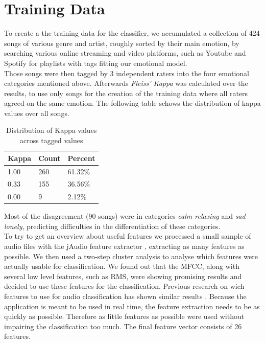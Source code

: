 \documentclass{sigchi-ext}
\begin{document}
\section{Training Data}\label{training-data}
To create a the training data for the classifier, we accumulated a collection of 424 songs of various genre and artist, roughly sorted by their main emotion, by searching various online streaming and video platforms, such as Youtube and Spotify for playlists with tags fitting our emotional model.\\
Those songs were then tagged by 3 independent raters into the four emotional categories mentioned above. Afterwards \textit{Fleiss' Kappa} was calculated over the results, to use only songs for the creation of the training data where all raters agreed on the same emotion. The following table schows the distribution of kappa values over all songs.\\

\begin{table}
\centering
\label{kappa-distribution}
\begin{tabular}{@{}lll@{}}
Kappa & Count & Percent \\ \midrule
1.00 & 260 & 61.32\% \\
0.33 & 155 & 36.56\% \\
0.00 & 9 	 & 2.12\%
\end{tabular}
\caption{Distribution of Kappa values across tagged values}
\end{table}

Most of the disagreement (90 songs) were in categories \textit{calm-relaxing} and \textit{sad-lonely}, predicting difficulties in the differentiation of these categories.\\

To try to get an overview about useful features we processed a small sample of audio files with the jAudio feature extractor \cite{McEnnis2005}, extracting as many features as possible. We then used a two-step cluster analysis to analyse which features were actually usable for classification. We found out that the MFCC, along with several low level features, such as RMS, were showing promising results and decided to use these features for the classification. Previous research on wich features to use for audio classification has shown similar results \cite{Mckinney2003, Mandel2005, Tzanetakis2001}. Because the application is meant to be used in real time, the feature extraction needs to be as quickly as possible. Therefore as little features as possible were used without impairing the classification too much. The final feature vector consists of 26 features.
\end{document}
